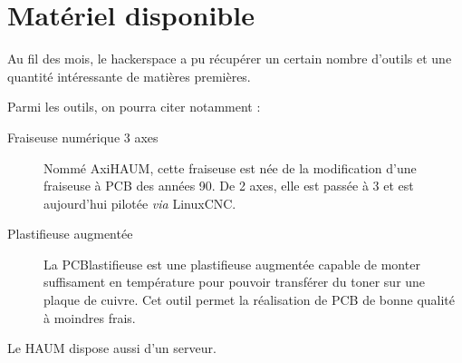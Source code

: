 \section{Matériel disponible}

Au fil des mois, le hackerspace a pu récupérer un certain nombre d'outils et une quantité intéressante de matières
premières.

Parmi les outils, on pourra citer notamment :

\begin{description}
    \item[Fraiseuse numérique 3 axes] Nommé AxiHAUM, cette fraiseuse est née de la modification d'une fraiseuse à PCB
        des années 90. De 2 axes, elle est passée à 3 et est aujourd'hui pilotée \textit{via} LinuxCNC.
    \item[Plastifieuse augmentée] La PCBlastifieuse est une plastifieuse augmentée capable de monter suffisament en
        température pour pouvoir transférer du toner sur une plaque de cuivre. Cet outil permet la réalisation de PCB de
        bonne qualité à moindres frais.
\end{description}

Le HAUM dispose aussi d'un serveur.




